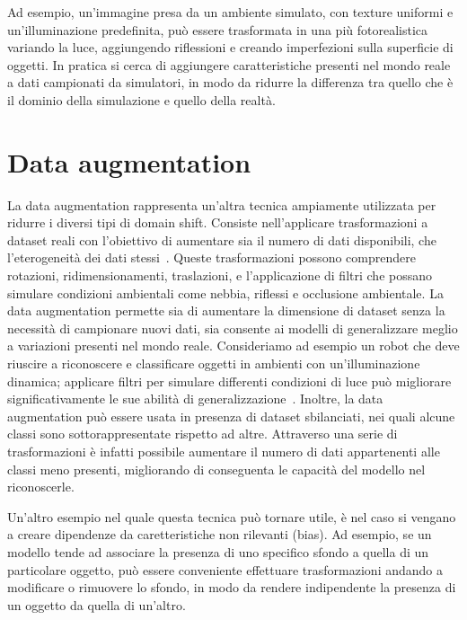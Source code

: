 \documentclass[12pt]{report}
\begin{document}
Ad esempio, un'immagine presa da un ambiente simulato, con texture uniformi e un'illuminazione predefinita, può essere trasformata in una più fotorealistica variando la luce, aggiungendo riflessioni e creando imperfezioni sulla superficie di oggetti. In pratica si cerca di aggiungere caratteristiche presenti nel mondo reale a dati campionati da simulatori, in modo da ridurre la differenza tra quello che è il dominio della simulazione e quello della realtà.

\section{Data augmentation}
\label{sec:augmentation}

La data augmentation rappresenta un'altra tecnica ampiamente utilizzata per ridurre i diversi tipi di domain shift. Consiste nell'applicare trasformazioni a dataset reali con l'obiettivo di aumentare sia il numero di dati disponibili, che l'eterogeneità dei dati stessi~\cite{Shorten2019}. Queste trasformazioni possono comprendere rotazioni, ridimensionamenti, traslazioni, e l'applicazione di filtri che possano simulare condizioni ambientali come nebbia, riflessi e occlusione ambientale. La data augmentation permette sia di aumentare la dimensione di dataset senza la necessità di campionare nuovi dati, sia consente ai modelli di generalizzare meglio a variazioni presenti nel mondo reale. Consideriamo ad esempio un robot che deve riuscire a riconoscere e classificare oggetti in ambienti con un'illuminazione dinamica; applicare filtri per simulare differenti condizioni di luce può migliorare significativamente le sue abilità di generalizzazione~\cite{NEURIPS2021_fb4c4860}. Inoltre, la data augmentation può essere usata in presenza di dataset sbilanciati, nei quali alcune classi sono sottorappresentate rispetto ad altre. Attraverso una serie di trasformazioni è infatti possibile aumentare il numero di dati appartenenti alle classi meno presenti, migliorando di conseguenta le capacità del modello nel riconoscerle.

Un'altro esempio nel quale questa tecnica può tornare utile, è nel caso si vengano a creare dipendenze da caretteristiche non rilevanti (bias). Ad esempio, se un modello tende ad associare la presenza di uno specifico sfondo a quella di un particolare oggetto, può essere conveniente effettuare trasformazioni andando a modificare o rimuovere lo sfondo, in modo da rendere indipendente la presenza di un oggetto da quella di un'altro.
\end{document}
